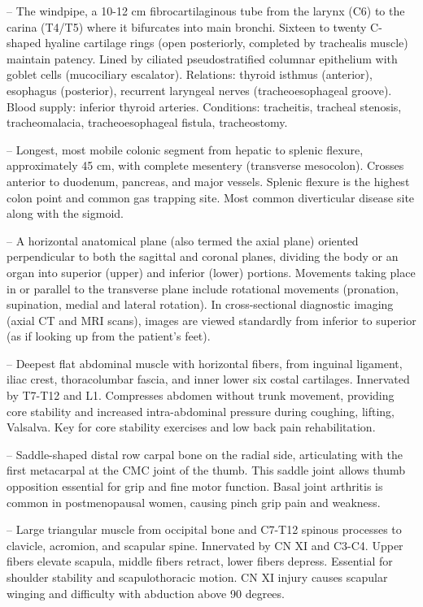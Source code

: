 -- The windpipe, a 10-12 cm fibrocartilaginous tube from the larynx (C6) to the carina (T4/T5) where it bifurcates into main bronchi. Sixteen to twenty C-shaped hyaline cartilage rings (open posteriorly, completed by trachealis muscle) maintain patency. Lined by ciliated pseudostratified columnar epithelium with goblet cells (mucociliary escalator). Relations: thyroid isthmus (anterior), esophagus (posterior), recurrent laryngeal nerves (tracheoesophageal groove). Blood supply: inferior thyroid arteries. Conditions: tracheitis, tracheal stenosis, tracheomalacia, tracheoesophageal fistula, tracheostomy.

-- Longest, most mobile colonic segment from hepatic to splenic flexure, approximately 45 cm, with complete mesentery (transverse mesocolon). Crosses anterior to duodenum, pancreas, and major vessels. Splenic flexure is the highest colon point and common gas trapping site. Most common diverticular disease site along with the sigmoid.

-- A horizontal anatomical plane (also termed the axial plane) oriented perpendicular to both the sagittal and coronal planes, dividing the body or an organ into superior (upper) and inferior (lower) portions. Movements taking place in or parallel to the transverse plane include rotational movements (pronation, supination, medial and lateral rotation). In cross-sectional diagnostic imaging (axial CT and MRI scans), images are viewed standardly from inferior to superior (as if looking up from the patient's feet).

-- Deepest flat abdominal muscle with horizontal fibers, from inguinal ligament, iliac crest, thoracolumbar fascia, and inner lower six costal cartilages. Innervated by T7-T12 and L1. Compresses abdomen without trunk movement, providing core stability and increased intra-abdominal pressure during coughing, lifting, Valsalva. Key for core stability exercises and low back pain rehabilitation.

-- Saddle-shaped distal row carpal bone on the radial side, articulating with the first metacarpal at the CMC joint of the thumb. This saddle joint allows thumb opposition essential for grip and fine motor function. Basal joint arthritis is common in postmenopausal women, causing pinch grip pain and weakness.

-- Large triangular muscle from occipital bone and C7-T12 spinous processes to clavicle, acromion, and scapular spine. Innervated by CN XI and C3-C4. Upper fibers elevate scapula, middle fibers retract, lower fibers depress. Essential for shoulder stability and scapulothoracic motion. CN XI injury causes scapular winging and difficulty with abduction above 90 degrees.

